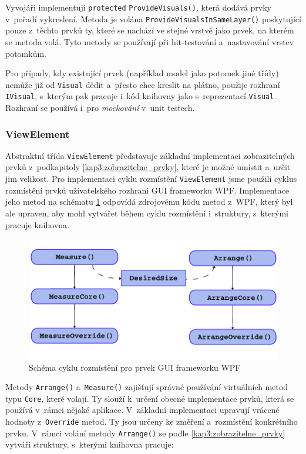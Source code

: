 Vyvojáři implementují \texttt{protected} \texttt{ProvideVisuals()}, která dodává prvky v~pořadí vykreslení. Metoda je volána \texttt{ProvideVisualsInSameLayer()} poskytující pouze z~těchto prvků ty, které se nachází ve stejné vrstvě jako prvek, na kterém se metoda volá. Tyto metody se používají při hit-testování a~nastavování vrstev potomkům.

Pro případy, kdy existující prvek (například model jako potomek jiné třídy) nemůže již od \texttt{Visual} dědit a~přesto chce kreslit na plátno, použije rozhraní \texttt{IVisual}, s~kterým pak pracuje i~kód knihovny jako s~reprezentací \texttt{Visual}. Rozhraní se používá i~pro \textit{mockování} v~unit testech.

\subsubsection*{ViewElement}
Abstraktní třída \texttt{ViewElement} představuje základní implementaci zobrazitelných prvků z~podkapitoly \ref{kap3:zobrazitelne_prvky}, které je možné umístit a~určit jim velikost. Pro implementaci cyklu rozmístění \texttt{ViewElement} jsme použili cyklus rozmístění prvků uživatelského rozhraní GUI frameworku WPF. Implementace jeho metod na schématu \ref{fig:arrange_WPF_kap4} odpovídá zdrojovému kódu metod z~WPF, který byl ale upraven, aby mohl vytvářet během cyklu rozmístění i~struktury, s~kterými pracuje knihovna.

\begin{figure}[!bht]
	\centering
	\includegraphics[width=\textwidth]{../img/kap3_wpf_element_layout_cycle_diagram}
	\caption{Schéma cyklu rozmístění pro prvek GUI frameworku WPF}
	\label{fig:arrange_WPF_kap4}
\end{figure}

\newpage
Metody \texttt{Arrange()} a~\texttt{Measure()} zajišťují správné používání virtuálních metod typu \texttt{Core}, které volají. Ty slouží k~určení obecné implementace prvků, která se používá v~rámci nějaké aplikace. V~základní implementaci upravují vrácené hodnoty z~\texttt{Override} metod. Ty jsou určeny ke změření a~rozmístění konkrétního prvku. V~rámci volání metody \texttt{Arrange()} se podle \ref{kap3:zobrazitelne_prvky} vytváří struktury, s~kterými knihovna pracuje:

